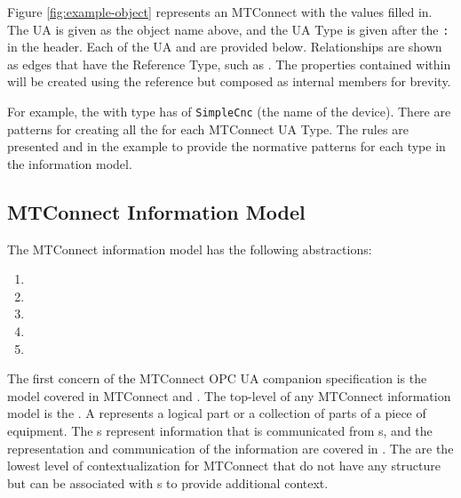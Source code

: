 Figure \ref{fig:example-object} represents an MTConnect  with the values filled in. The UA  is given as the object name above, and the UA Type is given after the \texttt{:} in the header. Each of the UA  and  are provided below. Relationships are shown as edges that have the Reference Type, such as . The properties contained within will be created using the  reference but composed as internal members for brevity.

For example, the with type  has  of \texttt{SimpleCnc} (the name of the device). There are patterns for creating all the  for each MTConnect UA Type. The rules are presented and in the example to provide the normative patterns for each type in the information model.

\FloatBarrier

\subsection{MTConnect Information Model}

The MTConnect information model has the following abstractions:

\begin{enumerate}
\item {}
\item {}
\item {}
\item {}
\item {}
\end{enumerate}

The first concern of the MTConnect OPC UA companion specification is the  model covered in MTConnect \cite{MTCPart2} and \cite{MTCPart3}. The top-level  of any MTConnect information model is the . A  represents a logical part or a collection of parts of a piece of equipment. The s represent information that is communicated from s, and the representation and communication of the information are covered in \cite{MTCPart3}. The  are the lowest level of contextualization for MTConnect  that do not have any structure but can be associated with s to provide additional context. 

